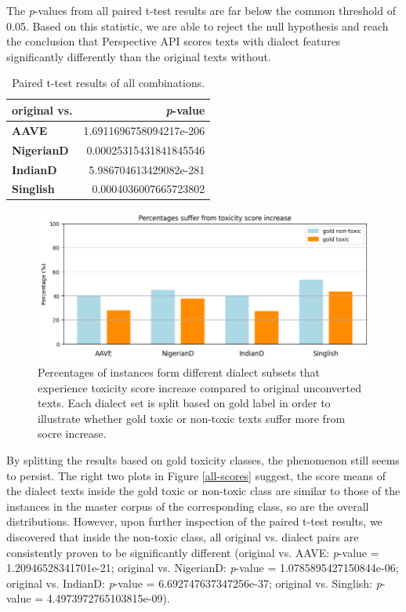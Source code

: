 \documentclass[11pt]{article}
\begin{document}
The \textit{p}-values from all paired t-test results are far below the common threshold of 0.05. Based on this statistic, we are able to reject the null hypothesis and reach the conclusion that Perspective API scores texts with dialect features significantly differently than the original texts without.

\begin{table}[t]
\centering
\begin{tabular}{lr}
\hline
\textbf{original vs.} & \textbf{\textit{p}-value}        \\ \hline
\textbf{AAVE}         & 1.6911696758094217e-206 \\
\textbf{NigerianD}    & 0.00025315431841845546  \\
\textbf{IndianD}      & 5.986704613429082e-281  \\
\textbf{Singlish}     & 0.0004036007665723802   \\ \hline
\end{tabular}
\caption{Paired t-test results of all combinations.}
\label{paired-overall}
\end{table}

\begin{figure}[t]
  \includegraphics[width=0.95\linewidth]{figs-misc/score-increase-percentages.png}
  \caption{Percentages of instances form different dialect subsets that experience toxicity score increase compared to original unconverted texts. Each dialect set is split based on gold label in order to illustrate whether gold toxic or non-toxic texts suffer more from socre increase.}
  \label{inc-percentages}
\end{figure}

By splitting the results based on gold toxicity classes, the phenomenon still seems to persist. The right two plots in Figure \ref{all-scores} suggest, the score means of the dialect texts inside the gold toxic or non-toxic class are similar to those of the instances in the master corpus of the corresponding class, so are the overall distributions. However, upon further inspection of the paired t-test results, we discovered that inside the non-toxic class, all original vs. dialect pairs are consistently proven to be significantly different (original vs. AAVE: \textit{p}-value = 1.20946528341701e-21; original vs. NigerianD: \textit{p}-value = 1.0785895427150844e-06; original vs. IndianD: \textit{p}-value = 6.692747637347256e-37; original vs. Singlish: \textit{p}-value = 4.4973972765103815e-09).
\end{document}
